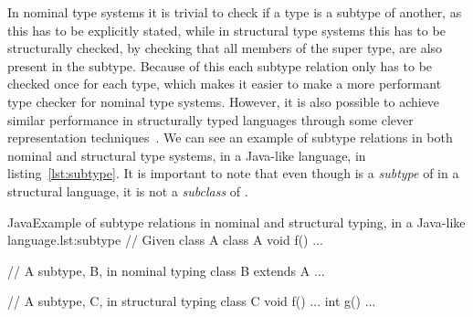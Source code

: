 In nominal type systems it is trivial to check if a type is a subtype of another, as this has to be explicitly stated, while in structural type systems this has to be structurally checked, by checking that all members of the super type, are also present in the subtype.
Because of this each subtype relation only has to be checked once for each type, which makes it easier to make a more performant type checker for nominal type systems.
However, it is also possible to achieve similar performance in structurally typed languages through some clever representation techniques~\cite{tapl}. %
We can see an example of subtype relations in both nominal and structural type systems, in a Java-like language, in listing~\vref{lst:subtype}.
It is important to note that even though  is a \emph{subtype} of  in a structural language, it is not a \emph{subclass} of .

\begin{code}{Java}{Example of subtype relations in nominal and structural typing, in a Java-like language.}{lst:subtype}
    // Given class A
    class A {
        void f() { ... }
     }

    // A subtype, B, in nominal typing
    class B extends A { ... }

    // A subtype, C, in structural typing
    class C {
        void f() { ... }
        int g() { ... }
    }
\end{code}

%
%
%


